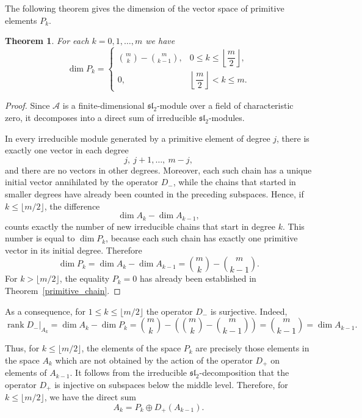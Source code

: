\documentclass[12pt,reqno]{amsart}
\newtheorem{theorem}{Theorem}[section]
\begin{document}
The following theorem gives the dimension of the vector space of primitive
elements $P_k$.

\begin{theorem}\label{primitive_dimensions}
For each $k=0,1,\dots,m$ we have
$$
\dim P_k=
\begin{cases}
\displaystyle \binom{m}{k}-\binom{m}{k-1},
& 0\le k\le \left\lfloor \dfrac m2\right\rfloor,\\[8pt]
0,
& \left\lfloor \dfrac m2\right\rfloor<k\le m.
\end{cases}
$$
\end{theorem}

\begin{proof}
Since $\mathcal A$ is a finite-dimensional $\mathfrak{sl}_2$-module over a
field of characteristic zero, it decomposes into a direct sum of irreducible
$\mathfrak{sl}_2$-modules.

In every irreducible module generated by a primitive element of degree $j$,
there is exactly one vector in each degree
$$
j,\ j+1,\dots,\ m-j,
$$
and there are no vectors in other degrees. Moreover, each such chain has a
unique initial vector annihilated by the operator $D_-$, while the chains that
started in smaller degrees have already been counted in the preceding
subspaces. Hence, if $k\le \lfloor m/2\rfloor$, the difference
$$
\dim A_k-\dim A_{k-1},
$$
counts exactly the number of new irreducible chains that start in degree
$k$. This number is equal to $\dim P_k$, because each such chain has exactly
one primitive vector in its initial degree.
Therefore
$$
\dim P_k
=
\dim A_k-\dim A_{k-1}
=
\binom{m}{k}-\binom{m}{k-1}.
$$
For $k>\lfloor m/2\rfloor$, the equality $P_k=0$ has already been established
in Theorem~\ref{primitive_chain}.
\end{proof}

As a consequence, for $1\le k\le \lfloor m/2\rfloor$ the operator
$
D_-
$
is surjective. Indeed,
$$
\operatorname{rank} D_-|_{A_k}
=
\dim A_k-\dim P_k
=
\binom{m}{k}
-
\left(\binom{m}{k}-\binom{m}{k-1}\right)
=
\binom{m}{k-1}
=
\dim A_{k-1}.
$$

Thus, for $k\le \lfloor m/2\rfloor$, the elements of the space $P_k$ are
precisely those elements in the space $A_k$ which are not obtained by the
action of the operator $D_+$ on elements of $A_{k-1}$.
It follows from the irreducible $\mathfrak{sl}_2$-decomposition that the
operator $D_+$ is injective on subspaces below the middle level. Therefore,
for $k\le \lfloor m/2\rfloor$, we have the direct sum
$$
A_k=P_k\oplus D_+(A_{k-1}).
$$
\end{document}
